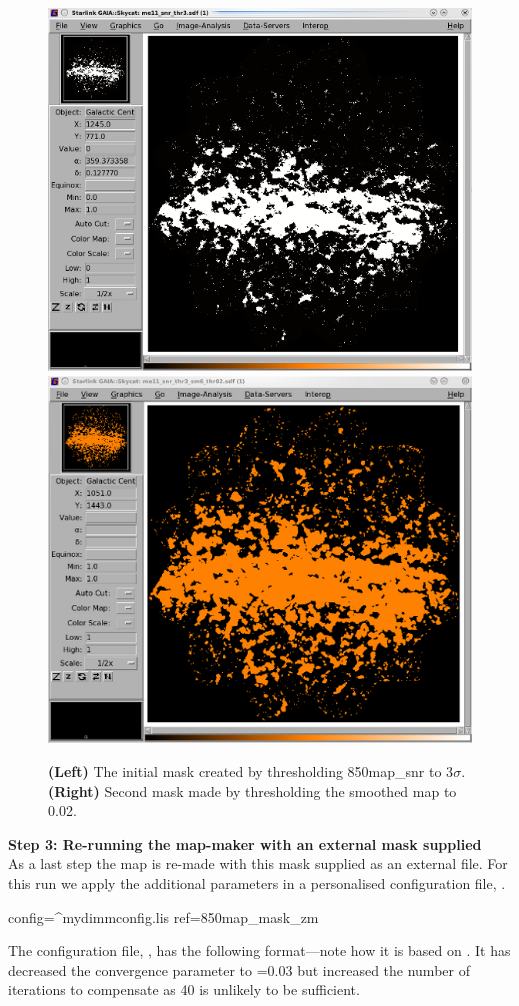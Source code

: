 \documentclass[11pt,oneside,chapters]{starlink}
\begin{document}
\begin{figure}[t]
\includegraphics[width=0.475\linewidth]{sc21_gal_mask1}
\hspace{2mm}
\includegraphics[width=0.475\linewidth]{sc21_gal_mask2}
\caption[Galactic example: thresholded SNR map and smoothed map]{
  \textbf{(Left)} The initial mask created by thresholding 850map\_snr
  to 3$\sigma$. \textbf{(Right)} Second mask made by thresholding the
  smoothed map to 0.02.\label{fig:mask}
}
\end{figure}


\textbf{Step 3: Re-running the map-maker with an external mask supplied}
\vspace{0.2cm}\\
As a last step the map is re-made with this mask supplied as an external
file. For this run we apply the additional parameters in a
personalised configuration file, .
\begin{terminalv}
config=^mydimmconfig.lis ref=850map_mask_zm
\end{terminalv}

The configuration file, , has the following
format---note how it is based on
. It has decreased the
convergence parameter to =0.03 but increased the number
of iterations to compensate as 40 is unlikely to be sufficient.
\end{document}
